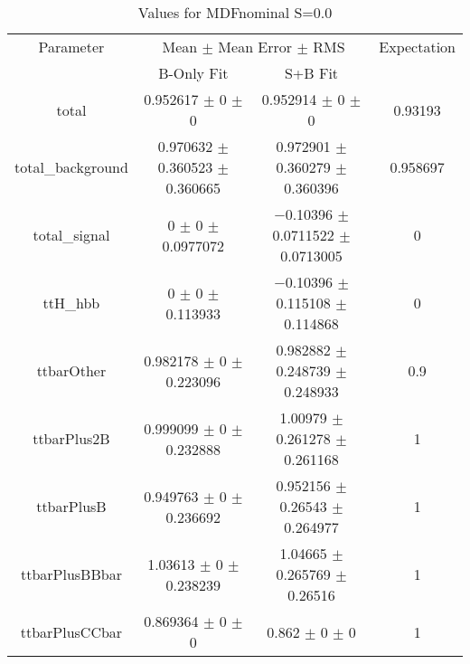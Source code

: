 \begin{table}
\centering
\caption{Values for MDFnominal S=0.0}
\begin{tabular}{cccc}
\toprule
Parameter & \multicolumn{2}{c}{Mean $\pm$ Mean Error $\pm$ RMS} & Expectation\\
 & B-Only Fit & S+B Fit & \\
\midrule
total & \num{0.952617} $\pm$ \num{0} $\pm$ \num{0} & \num{0.952914} $\pm$ \num{0} $\pm$ \num{0} & \num{0.93193}\\
total\_background & \num{0.970632} $\pm$ \num{0.360523} $\pm$ \num{0.360665} & \num{0.972901} $\pm$ \num{0.360279} $\pm$ \num{0.360396} & \num{0.958697}\\
total\_signal & \num{0} $\pm$ \num{0} $\pm$ \num{0.0977072} & \num{-0.10396} $\pm$ \num{0.0711522} $\pm$ \num{0.0713005} & \num{0}\\
ttH\_hbb & \num{0} $\pm$ \num{0} $\pm$ \num{0.113933} & \num{-0.10396} $\pm$ \num{0.115108} $\pm$ \num{0.114868} & \num{0}\\
ttbarOther & \num{0.982178} $\pm$ \num{0} $\pm$ \num{0.223096} & \num{0.982882} $\pm$ \num{0.248739} $\pm$ \num{0.248933} & \num{0.9}\\
ttbarPlus2B & \num{0.999099} $\pm$ \num{0} $\pm$ \num{0.232888} & \num{1.00979} $\pm$ \num{0.261278} $\pm$ \num{0.261168} & \num{1}\\
ttbarPlusB & \num{0.949763} $\pm$ \num{0} $\pm$ \num{0.236692} & \num{0.952156} $\pm$ \num{0.26543} $\pm$ \num{0.264977} & \num{1}\\
ttbarPlusBBbar & \num{1.03613} $\pm$ \num{0} $\pm$ \num{0.238239} & \num{1.04665} $\pm$ \num{0.265769} $\pm$ \num{0.26516} & \num{1}\\
ttbarPlusCCbar & \num{0.869364} $\pm$ \num{0} $\pm$ \num{0} & \num{0.862} $\pm$ \num{0} $\pm$ \num{0} & \num{1}\\
\bottomrule
\end{tabular}
\end{table}